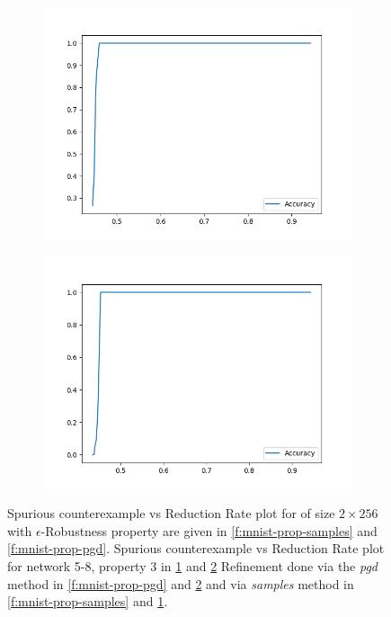 \begin{figure}
    \begin{subfigure}{0.475\linewidth}
        \includegraphics[scale=0.275]{figs/acas_ncex_5_8_3_samples.png}
        \caption{}
        \label{f:acas-ncex-samples}
    \end{subfigure}
    \begin{subfigure}{0.475\linewidth}
        \includegraphics[scale=0.275]{figs/acas_ncex_5_8_3_pgd.png}
        \caption{}
        \label{f:acas-ncex-pgd}
    \end{subfigure}

    \caption{
        Spurious counterexample vs Reduction Rate plot for \mnist of size $2
        \times 256$ with $\epsilon$-Robustness property are given in 
        \ref{f:mnist-prop-samples} and \ref{f:mnist-prop-pgd}. 
        Spurious counterexample vs Reduction Rate plot for \acasxu network 5-8,
        property 3 in \ref{f:acas-ncex-samples} and \ref{f:acas-ncex-pgd}
        Refinement done via the \textit{pgd} method in
        \ref{f:mnist-prop-pgd} and \ref{f:acas-ncex-pgd} and 
        via \textit{samples} method in \ref{f:mnist-prop-samples} and
        \ref{f:acas-ncex-samples}.
    }
    \label{f:ncex}
\end{figure}

